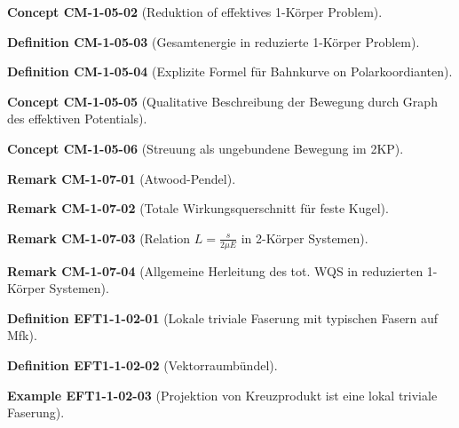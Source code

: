 \documentclass[10pt, letterpaper]{article}
\newcommand{\CustomHeading}[3]{%
  \par\medskip\noindent%
  \textbf{#1 #2} \textnormal{(#3)}.\enskip%
}
\newenvironment{DEF}[2]{\CustomHeading{Definition}{#1}{#2}}{}
\newenvironment{REM}[2]{\CustomHeading{Remark}{#1}{#2}}{}
\newenvironment{EXA}[2]{\CustomHeading{Example}{#1}{#2}}{}
\newenvironment{CONC}[2]{\CustomHeading{Concept}{#1}{#2}}{}
\begin{document}
\begin{CONC}{CM-1-05-02}{Reduktion of effektives 1-Körper Problem}
\end{CONC}

\begin{DEF}{CM-1-05-03}{Gesamtenergie in reduzierte 1-Körper Problem}
\end{DEF}

\begin{DEF}{CM-1-05-04}{Explizite Formel für Bahnkurve on Polarkoordianten}
\end{DEF}

\begin{CONC}{CM-1-05-05}{Qualitative Beschreibung der Bewegung durch Graph des effektiven Potentials}
\end{CONC}

\begin{CONC}{CM-1-05-06}{Streuung als ungebundene Bewegung im 2KP}
\end{CONC}

\begin{REM}{CM-1-07-01}{Atwood-Pendel}
\end{REM}

\begin{REM}{CM-1-07-02}{Totale Wirkungsquerschnitt für feste Kugel}
\end{REM}

\begin{REM}{CM-1-07-03}{Relation $L = \frac{s}{2\mu E}$ in 2-Körper Systemen}
\end{REM}

\begin{REM}{CM-1-07-04}{Allgemeine Herleitung des tot. WQS in reduzierten 1-Körper Systemen}
\end{REM}

\begin{DEF}{EFT1-1-02-01}{Lokale triviale Faserung mit typischen Fasern auf Mfk}
\end{DEF}

\begin{DEF}{EFT1-1-02-02}{Vektorraumbündel}
\end{DEF}

\begin{EXA}{EFT1-1-02-03}{Projektion von Kreuzprodukt ist eine lokal triviale Faserung}
\end{EXA}
\end{document}
